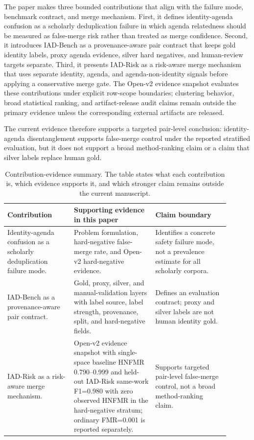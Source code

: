 \documentclass[11pt]{article}
\begin{document}
The paper makes three bounded contributions that align with the failure mode, benchmark contract, and merge mechanism. First, it defines identity-agenda confusion as a scholarly deduplication failure in which agenda relatedness should be measured as false-merge risk rather than treated as merge confidence. Second, it introduces IAD-Bench as a provenance-aware pair contract that keeps gold identity labels, proxy agenda evidence, silver hard negatives, and human-review targets separate. Third, it presents IAD-Risk as a risk-aware merge mechanism that uses separate identity, agenda, and agenda-non-identity signals before applying a conservative merge gate. The Open-v2 evidence snapshot evaluates these contributions under explicit row-scope boundaries; clustering behavior, broad statistical ranking, and artifact-release audit claims remain outside the primary evidence unless the corresponding external artifacts are released.

The current evidence therefore supports a targeted pair-level conclusion: identity-agenda disentanglement supports false-merge control under the reported stratified evaluation, but it does not support a broad method-ranking claim or a claim that silver labels replace human gold.

\begin{table}[H]
\caption{Contribution-evidence summary. The table states what each contribution is, which evidence supports it, and which stronger claim remains outside the current manuscript.}
\label{tab:contribution-evidence-summary}
\centering
\footnotesize
\setlength{\tabcolsep}{3pt}
\begin{tabular}{L{0.27\linewidth}L{0.33\linewidth}L{0.30\linewidth}}
\toprule
Contribution & Supporting evidence in this paper & Claim boundary \\
\midrule
Identity-agenda confusion as a scholarly deduplication failure mode. & Problem formulation, hard-negative false-merge rate, and Open-v2 hard-negative evidence. & Identifies a concrete safety failure mode, not a prevalence estimate for all scholarly corpora. \\
IAD-Bench as a provenance-aware pair contract. & Gold, proxy, silver, and manual-validation layers with label source, label strength, provenance, split, and hard-negative fields. & Defines an evaluation contract; proxy and silver labels are not human identity gold. \\
IAD-Risk as a risk-aware merge mechanism. & Open-v2 evidence snapshot with single-space baseline HNFMR 0.790--0.999 and held-out IAD-Risk same-work F1=0.980 with zero observed HNFMR in the hard-negative stratum; ordinary FMR=0.001 is reported separately. & Supports targeted pair-level false-merge control, not a broad method-ranking claim. \\
\bottomrule
\end{tabular}
\end{table}
\end{document}
